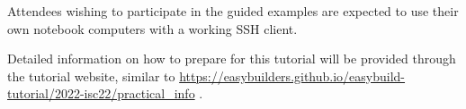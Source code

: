 Attendees wishing to participate in the guided examples are expected to use their
own notebook computers with a working SSH client.

Detailed information on how to prepare for this tutorial will be provided
through the tutorial website, similar to
\url{https://easybuilders.github.io/easybuild-tutorial/2022-isc22/practical_info} .

